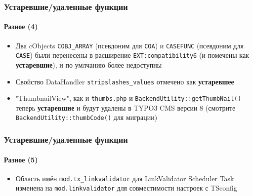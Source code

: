 \begin{frame}[fragile]
	\frametitle{Устаревшие/удаленные функции}
	\framesubtitle{Разное (4)}

	\lstset{basicstyle=\tiny\ttfamily}

	\begin{itemize}

		\item Два cObjects
			\small\texttt{COBJ\_ARRAY}\normalsize\space
			(псевдоним для \texttt{COA})
			и
			\small\texttt{CASEFUNC}\normalsize\space
			(псевдоним для \texttt{CASE})
			были перенесены в расширение \texttt{EXT:compatibility6}
			(и помечены как \textbf{устаревшие}), и по умлчанию более недоступны

		\item Свойство DataHandler
			\small\texttt{stripslashes\_values}\normalsize\space
			отмечено как \textbf{устаревшее}

		\item "ThumbnailView", как и \texttt{thumbs.php} и \texttt{BackendUtility::getThumbNail()}
			теперь \textbf{устаревшие} и будут удалены в TYPO3 CMS версии 8\newline
			(смотрите \texttt{BackendUtility::thumbCode()} для миграции)

	\end{itemize}

\end{frame}


\begin{frame}[fragile]
	\frametitle{Устаревшие/удаленные функции}
	\framesubtitle{Разное (5)}

	\lstset{basicstyle=\tiny\ttfamily}

	\begin{itemize}

		\item Область имён \texttt{mod.tx\_linkvalidator} для LinkValidator
			Scheduler Task изменена на \texttt{mod.linkvalidator} для совместимости
			настроек с TSconfig

	\end{itemize}

\end{frame}

